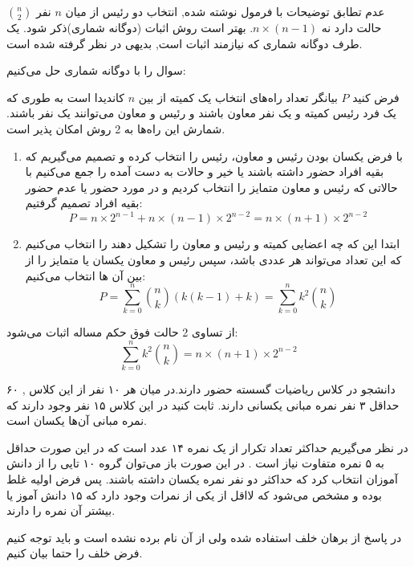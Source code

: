 \documentclass[11pt,largemargins]{h2wp}
\begin{document}
     
\notes
{}
عدم تطابق توضیحات با فرمول نوشته شده, انتخاب دو رئیس از میان $n$ نفر $\binom{n}{2}$ حالت دارد نه $n\times(n-1)$. 
بهتر است روش اثبات (دوگانه شماری)ذکر شود.
یک طرف دوگانه شماری که نیازمند اثبات است, بدیهی در نظر گرفته شده است.

سوال را با دوگانه شماری حل می‌کنیم:

   فرض کنید $ P$ بیانگر تعداد راه‌های انتخاب یک کمیته از بین $n$ کاندیدا است به طوری که یک فرد رئیس کمیته و یک نفر معاون باشند و رئیس و معاون می‌توانند یک نفر باشند. شمارش این راه‌ها به 2 روش امکان پذیر است.
    \begin{enumerate}
        \item 
        با فرض یکسان بودن رئیس و معاون، رئیس را انتخاب کرده و تصمیم می‌گیریم که بقیه افراد حضور داشته باشند یا خیر و حالات به دست آمده را جمع می‌کنیم با حالاتی که رئیس و معاون متمایز را انتخاب کردیم و در مورد حضور یا عدم حضور بقیه افراد تصمیم گرفتیم:
        \[P = n\times{2^{n-1}} + n\times(n-1)\times{2^{n-2}} = n\times(n+1)\times{2^{n-2}}\]
        \item
        ابتدا این که چه اعضایی کمیته و رئیس و معاون را تشکیل دهند را انتخاب می‌کنیم که این تعداد می‌تواند هر عددی باشد، سپس رئیس و معاون یکسان یا متمایز را از بین آن ها انتخاب می‌کنیم:
        \[P = \displaystyle\sum_{k=0}^{n} {\binom{n}{k}(k(k-1)+k)} = \displaystyle\sum_{k=0}^{n} {{k^2}\binom{n}{k}}\]
    \end{enumerate}
    از تساوی 2 حالت فوق حکم مساله اثبات می‌شود:
    \[\displaystyle\sum_{k=0}^{n} {{k^2}\binom{n}{k}} = n\times(n+1)\times{2^{n-2}}\]
   
   
    

\question


۶۰ دانشجو در کلاس ریاضیات گسسته حضور دارند.در میان هر ۱۰ نفر از این کلاس , حداقل ۳ نفر نمره مبانی یکسانی دارند. ثابت کنید در این کلاس ۱۵ نفر وجود دارند که نمره مبانی آن‌ها یکسان است.

\solution

در نظر می‌گیریم حداکثر تعداد تکرار از یک نمره ۱۴ عدد است که در این صورت حداقل به ۵ نمره متفاوت نیاز است . 
در این صورت باز می‌توان گروه ۱۰ تایی را از دانش آموزان انتخاب کرد که حداکثر دو نفر نمره یکسان داشته باشند. پس فرض اولیه غلط بوده و مشخص می‌شود که لااقل از یکی از نمرات وجود دارد که ۱۵ دانش آموز یا بیشتر 
آن نمره را دارند.
 


\notes

در پاسخ از برهان خلف استفاده شده ولی از آن نام برده نشده است و باید توجه کنیم فرض خلف را حتما بیان کنیم.
\end{document}
